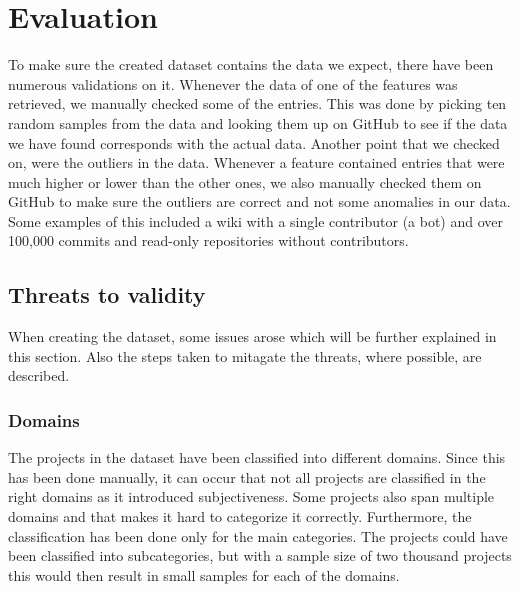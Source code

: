 \section{Evaluation}
To make sure the created dataset contains the data we expect, there have been numerous validations on it.
Whenever the data of one of the features was retrieved, we manually checked some of the entries.
This was done by picking ten random samples from the data and looking them up on GitHub to see if the data we have found corresponds with the actual data.
Another point that we checked on, were the outliers in the data.
Whenever a feature contained entries that were much higher or lower than the other ones, we also manually checked them on GitHub to make sure the outliers are correct and not some anomalies in our data.
Some examples of this included a wiki with a single contributor (a bot) and over 100,000 commits and read-only repositories without contributors. 

\subsection{Threats to validity}
When creating the dataset, some issues arose which will be further explained in this section.
Also the steps taken to mitagate the threats, where possible, are described. \\

\subsubsection{Domains}
The projects in the dataset have been classified into different domains.
Since this has been done manually, it can occur that not all projects are classified in the right domains as it introduced subjectiveness.
Some projects also span multiple domains and that makes it hard to categorize it correctly.
Furthermore, the classification has been done only for the main categories.
The projects could have been classified into subcategories, but with a sample size of two thousand projects this would then result in small samples for each of the domains.\\

